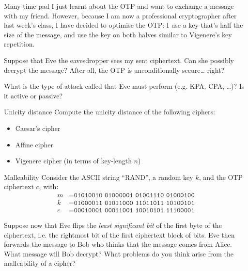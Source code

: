 \documentclass{practice}
\begin{document}
\begin{task}{Many-time-pad}
  I just learnt about the OTP and want to exchange a message with my friend.
  However, because I am now a professional cryptographer after last week's class, I have decided to optimise the OTP:
  I use a key that's half the size of the message, and use the key on both halves similar to Vigenere's key repetition.

  Suppose that Eve the eavesdropper sees my sent ciphertext.
  Can she possibly decrypt the message?
  After all, the OTP is unconditionally secure\dots{} right?
  
  What is the type of attack called that Eve must perform (e.g. KPA, CPA, \dots)?
  Is it active or passive?
\end{task}

\begin{task}{Unicity distance}
  Compute the unicity distance of the following ciphers:
  \begin{itemize}
    \item Caesar's cipher
    \item Affine cipher
    \item Vigenere cipher (in terms of key-length $n$)
  \end{itemize}
\end{task}

\begin{task}{Malleability}
  Consider the ASCII string \enquote{RAND}, a random key $k$, and the OTP ciphertext $c$, with:
  \begin{align*}
    m &= \texttt{01010010 01000001 01001110 01000100}\\
    k &= \texttt{01000011 01011000 11011011 10100101}\\
    c &= \texttt{00010001 00011001 10010101 11100001}
  \end{align*}

  Suppose now that Eve flips the \emph{least significant bit} of the first byte of the ciphertext, i.e. the rightmost bit of the first ciphertext block of bits.
  Eve then forwards the message to Bob who thinks that the message comes from Alice.
  What message will Bob decrypt?
  What problems do you think arise from the malleability of a cipher?
\end{task}
\end{document}
